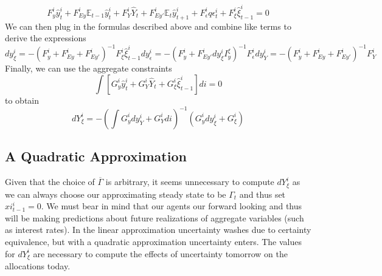 \documentclass[thmsb,11pt]{article}
\newcommand{\EE}{\mathbb E}
\begin{document}
\[
	F^i_y\hat y^i_t + F^i_{Ey}\EE_{t-1}\hat y^i_{t} + F^i_Y \hat Y_t + F^i_{Ey'} \EE_t\hat y^i_{t+1} + F^i_\epsilon q\epsilon^i_t + F^i_\xi \hat \xi^i_{t-1} = 0
\]We can then plug in the formulas described above and combine like terms to derive the expressions
\begin{subequations}
\begin{equation}
	dy^i_\xi = -(F^i_y + F^i_{Ey} + F^i_{Ey'})^{-1}F^i_\xi \hat\xi^i_{t-1}
\end{equation}
\begin{equation}
	dy^i_\epsilon = -(F^i_y + F^i_{Ey'} dy^i_\xi I^\xi_y)^{-1} F^i_\epsilon 
\end{equation}
\begin{equation}
	dy^i_Y = -(F^i_y + F^i_{Ey} + F^i_{Ey'})^{-1} F^i_Y
\end{equation}
\end{subequations}Finally, we can use the aggregate constraints
\[
	\int\left[ G^i_y \hat y^i_t + G^i_Y \hat Y_t+ G^i_\xi \hat \xi^i_{t-1}\right]di = 0
\]to obtain
\begin{equation}
	dY^i_\xi =- \left(\int G^i_y dy^i_Y + G^i_Ydi\right)^{-1}\left(G^i_y dy^i_\xi + G^i_\xi\right)
\end{equation}
\subsection{A Quadratic Approximation}
Given that the choice of $\overline \Gamma$ is arbitrary, it seems unnecessary to compute $dY^i_\xi$ as we can always choose our approximating steady state to be $\Gamma_t$ and thus set $\hat xi^i_{t-1} =0$.  We must bear in mind that our agents our forward looking and thus will be making predictions about future realizations of aggregate variables (such as interest rates).  In the linear approximation uncertainty washes due to certainty equivalence, but with a quadratic approximation uncertainty enters.  The values for $dY^i_\xi$ are necessary to compute the effects of uncertainty tomorrow on the allocations today.
\end{document}
